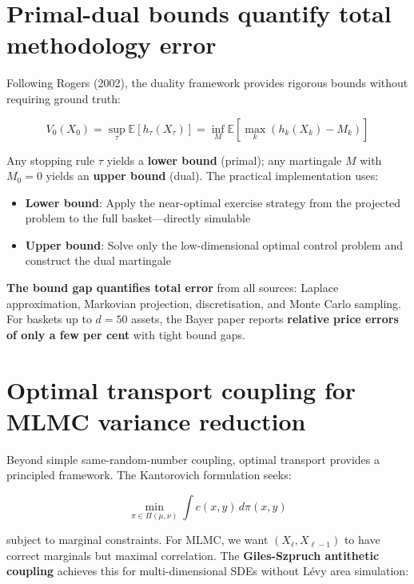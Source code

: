 \documentclass[11pt,a4paper]{article}
\begin{document}
\section{Primal-dual bounds quantify total methodology error}

Following Rogers (2002), the duality framework provides rigorous bounds without requiring ground truth:

\begin{equation}
V_0(X_0) = \sup_\tau \mathbb{E}[h_\tau(X_\tau)] = \inf_M \mathbb{E}\left[\max_k (h_k(X_k) - M_k)\right]
\end{equation}

\noindent Any stopping rule $\tau$ yields a \textbf{lower bound} (primal); any martingale $M$ with $M_0 = 0$ yields an \textbf{upper bound} (dual). The practical implementation uses:

\begin{itemize}[leftmargin=*,topsep=5pt,itemsep=3pt]
\item \textbf{Lower bound}: Apply the near-optimal exercise strategy from the projected problem to the full basket---directly simulable
\item \textbf{Upper bound}: Solve only the low-dimensional optimal control problem and construct the dual martingale
\end{itemize}

\noindent \textbf{The bound gap quantifies total error} from all sources: Laplace approximation, Markovian projection, discretisation, and Monte Carlo sampling. For baskets up to $d=50$ assets, the Bayer paper reports \textbf{relative price errors of only a few per cent} with tight bound gaps.

\section{Optimal transport coupling for MLMC variance reduction}

Beyond simple same-random-number coupling, optimal transport provides a principled framework. The Kantorovich formulation seeks:

\begin{equation}
\min_{\pi \in \Pi(\mu, \nu)} \int c(x,y) \, d\pi(x,y)
\end{equation}

\noindent subject to marginal constraints. For MLMC, we want $(X_\ell, X_{\ell-1})$ to have correct marginals but maximal correlation. The \textbf{Giles-Szpruch antithetic coupling} achieves this for multi-dimensional SDEs without Lévy area simulation:
\end{document}
